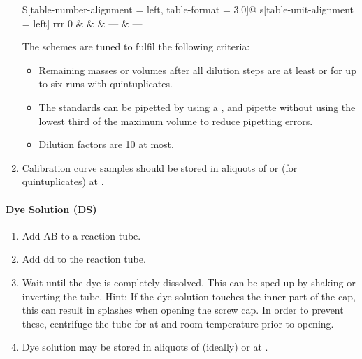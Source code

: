 \begin{enumerate}
\begin{tabular}{%
			S[table-number-alignment = left, table-format = 3.0]@{\hspace{0.2em}}%
			s[table-unit-alignment = left]%
			rrr}
			0 & \si{\mgpl} &  & --- & --- \\
		\end{tabular}
		The schemes are tuned to fulfil the following criteria:
			\begin{itemize}
				\item Remaining masses or volumes after all dilution steps are at least  or  for up to six runs with quintuplicates.
				\item The standards can be pipetted by using a ,  and  pipette without using the lowest third of the maximum volume to reduce pipetting errors.
				\item Dilution factors are 10 at most.
			\end{itemize}
	\item Calibration curve samples should be stored in aliquots of  or  (for quintuplicates) at .
	\setcounter{sirofluor-protocol}{\value{enumi}}
\end{enumerate}

\paragraph{Dye Solution (DS)}
\begin{enumerate}
	\setcounter{enumi}{\value{sirofluor-protocol}}
	\item Add  AB to a  reaction tube.
	\item Add  dd to the reaction tube.
	\item Wait until the dye is completely dissolved. This can be sped up by shaking or inverting the tube.\newline
		Hint: If the dye solution touches the inner part of the cap, this can result in splashes when opening the screw cap. In order to prevent these, centrifuge the tube for  at  and room temperature prior to opening.
	\item Dye solution may be stored in aliquots of  (ideally) or  at .
	\setcounter{sirofluor-protocol}{\value{enumi}}
\end{enumerate}

